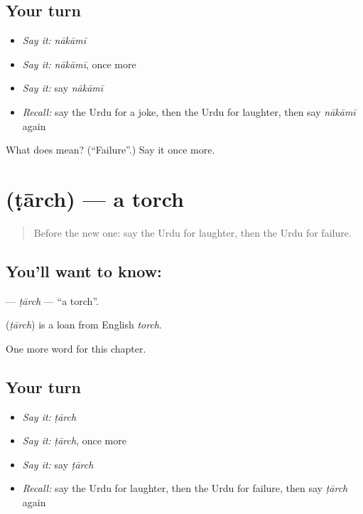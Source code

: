 \subsection*{Your turn}
\begin{itemize}
\raggedright
  \item \emph{Say it:} \emph{nākāmī}
  \item \emph{Say it:} \emph{nākāmī}, once more
  \item \emph{Say it:} say \emph{nākāmī}
  \item \emph{Recall:} say the Urdu for a joke, then the Urdu for laughter, then say \emph{nākāmī} again
\end{itemize}

\begin{tcolorbox}[breakable,colback=teal!4,colframe=teal!35!black,title={Before you move on}]
What does  mean? (\textquotedblleft{}Failure\textquotedblright{}.) Say it once more.
\end{tcolorbox}
\section[\texorpdfstring{\ur{ٹارچ} (ṭārch)}{ٹارچ (ṭārch)}]{ (ṭārch) — a torch}

\label{lesson:UR-C232-tarch}



\begin{quote}
Before the new one: say the Urdu for laughter, then the Urdu for failure.
\end{quote}

\subsection*{You'll want to know: }
\textbf{} — \emph{ṭārch} — \textquotedblleft{}a torch\textquotedblright{}.

\begin{cousinweb}
\textbf{} (\emph{ṭārch}) is a loan from English \emph{torch}.
\end{cousinweb}

\begin{grammarlens}[title={What you've built}]
One more word for this chapter.
\end{grammarlens}

\subsection*{Your turn}
\begin{itemize}
\raggedright
  \item \emph{Say it:} \emph{ṭārch}
  \item \emph{Say it:} \emph{ṭārch}, once more
  \item \emph{Say it:} say \emph{ṭārch}
  \item \emph{Recall:} say the Urdu for laughter, then the Urdu for failure, then say \emph{ṭārch} again
\end{itemize}

